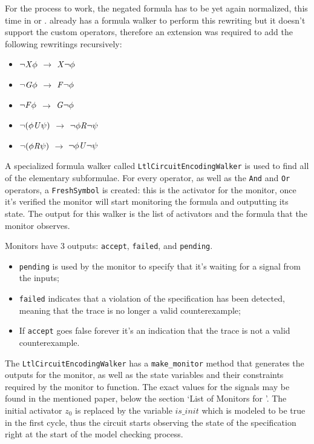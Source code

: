 For the process to work, the negated formula has to be yet again normalized, this time in \nnf{} or \NNF{}. \pysmt{} already has a formula walker to perform this rewriting but it doesn't support the custom \ltl{} operators, therefore an extension was required to add the following rewritings recursively:
\begin{itemize}
    \item $\lnot \mathit{X}{} \phi$ $\longrightarrow$ $\mathit{X} \lnot \phi$
    \item $\lnot \mathit{G}{} \phi$ $\longrightarrow$ $\mathit{F} \lnot \phi$
    \item $\lnot \mathit{F}{} \phi$ $\longrightarrow$ $\mathit{G} \lnot \phi$
    \item $\lnot (\phi \mathit{U}{} \psi)$ $\longrightarrow$ $\lnot \phi \mathit{R} \lnot \psi$
    \item $\lnot (\phi \mathit{R}{} \psi)$ $\longrightarrow$ $\lnot \phi \mathit{U} \lnot \psi$
\end{itemize}

A specialized formula walker called \texttt{LtlCircuitEncodingWalker} is used to find all of the elementary subformulae.
For every \ltl{} operator, as well as the \texttt{And} and \texttt{Or} operators, a \texttt{FreshSymbol} is created: this is the activator for the monitor, once it's verified the monitor will start monitoring the formula and outputting its state.
The output for this walker is the list of activators and the formula that the monitor observes.

Monitors have 3 outputs: \texttt{accept}, \texttt{failed}, and \texttt{pending}.
\begin{itemize}
    \item \texttt{pending} is used by the monitor to specify that it's waiting for a signal from the inputs;
    \item \texttt{failed} indicates that a violation of the specification has been detected, meaning that the trace is no longer a valid counterexample;
    \item If \texttt{accept} goes false forever it's an indication that the trace is not a valid counterexample.
\end{itemize}

The \texttt{LtlCircuitEncodingWalker} has a \texttt{make\_monitor} method that generates the outputs for the monitor, as well as the state variables and their constraints required by the monitor to function.
The exact values for the signals may be found in the mentioned paper, below the section `List of Monitors for \pltl'.
The initial activator $\mathit{z_0}$ is replaced by the variable $\mathit{is\_init}$ which is modeled to be true in the first cycle, thus the circuit starts observing the state of the specification right at the start of the model checking process.


